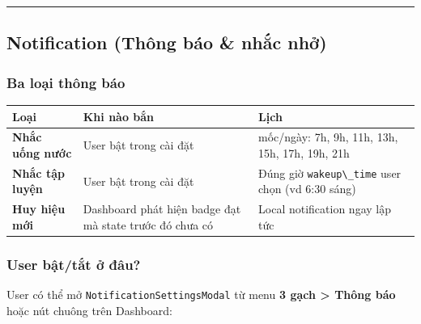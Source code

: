 \documentclass[12pt,a4paper]{article}
\newcounter{none}
\providecommand{\passthrough}[1]{#1}
\begin{document}
\begin{center}\rule{0.5\linewidth}{0.5pt}\end{center}

\subsection{Notification (Thông báo \& nhắc
nhở)}\label{notification-thuxf4ng-buxe1o-nhux1eafc-nhux1edf}

\subsubsection{Ba loại thông báo}\label{ba-loux1ea1i-thuxf4ng-buxe1o}

{\def\LTcaptype{none} %
\begin{longtable}[]{@{}
  >{\raggedright\arraybackslash}p{}
  >{\raggedright\arraybackslash}p{}
  >{\raggedright\arraybackslash}p{}@{}}
\toprule\noalign{}
\begin{minipage}[b]{\linewidth}\raggedright
Loại
\end{minipage} & \begin{minipage}[b]{\linewidth}\raggedright
Khi nào bắn
\end{minipage} & \begin{minipage}[b]{\linewidth}\raggedright
Lịch
\end{minipage} \\
\midrule\noalign{}
\endhead
\bottomrule\noalign{}
\endlastfoot
\textbf{Nhắc uống nước} & User bật trong cài đặt & 8 mốc/ngày: 7h, 9h,
11h, 13h, 15h, 17h, 19h, 21h \\
\textbf{Nhắc tập luyện} & User bật trong cài đặt & Đúng giờ
\passthrough{\lstinline!wakeup\_time!} user chọn (vd 6:30 sáng) \\
\textbf{Huy hiệu mới} & Dashboard phát hiện badge đạt mà state trước đó
chưa có & Local notification ngay lập tức \\
\end{longtable}
}

\subsubsection{User bật/tắt ở
đâu?}\label{user-bux1eadttux1eaft-ux1edf-ux111uxe2u}

User có thể mở \passthrough{\lstinline!NotificationSettingsModal!} từ
menu \textbf{3 gạch \textgreater{} Thông báo} hoặc nút chuông trên
Dashboard:
\end{document}
